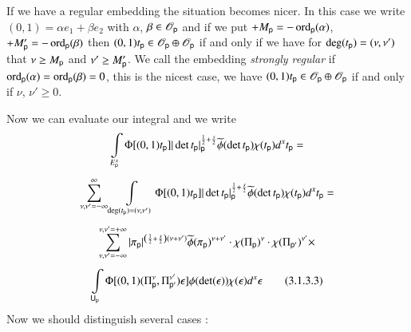 If we have a regular embedding the situation becomes nicer. In this case we write $(0,1)=\alpha e_{1}+\beta e_{2}$ with $\alpha$, $\beta\in \mathscr{O}_{\mathsf{p}}$ and if we put $+M_{\mathsf{p}}=-\operatorname{ord}_{\mathsf{p}} (\alpha)$, $+M'_{\mathsf{p}}=-\operatorname{ord}_{\mathsf{p}}(\beta)$ then $(0,1)t_{\mathsf{p}}\in \mathscr{O}_{\mathsf{p}}\oplus \mathscr{O}_{\mathsf{p}}$ if and only if we have for $\deg (t_{\mathsf{p}})=(\nu,\nu')$ that $\nu\geq M_{\mathsf{p}}$ and $\nu'\geq M'_{\mathsf{p}}$. We call the embedding {\em strongly regular} if $\operatorname{ord}_{\mathsf{p}}(\alpha)=\operatorname{ord}_{\mathsf{p}}(\beta)=0$, this is the nicest case, we have $(0,1)t_{\mathsf{p}}\in \mathscr{O}_{\mathsf{p}}\oplus \mathscr{O}_{\mathsf{p}}$ if and only if $\nu$, $\nu'\geq 0$.

Now we can evaluate our integral and we write
\begin{gather*}
\int\limits_{E^{x}_{\mathsf{p}}}\Phi[(0,1)t_{\mathsf{p}}]|\det t_{\mathsf{p}}|_{\mathsf{p}}^{\frac{1}{2}+\frac{s}{2}}\widetilde{\phi}(\det t_{\mathsf{p}})\chi(t_{\mathsf{p}})d^{x}t_{\mathsf{p}}=\\[4pt]
\sum\limits^{\infty}_{\nu,\nu'=-\infty}\int\limits_{\deg(t_{\mathsf{p}})=(\nu,\nu')}\Phi[(0,1)t_{\mathsf{p}}]|\det t_{\mathsf{p}}|_{\mathsf{p}}^{\frac{1}{2}+\frac{s}{2}}\widetilde{\phi}(\det t_{\mathsf{p}})\chi(t_{\mathsf{p}})d^{x}t_{\mathsf{p}}=\\[4pt]
\sum\limits^{\nu,\nu'= +\infty}_{\nu,\nu'=-\infty}|\pi_{\mathsf{p}}|^{\left(\frac{1}{2}+\frac{s}{2}\right)(\nu+\nu')}\widetilde{\phi}(\pi_{\mathsf{p}})^{\nu+\nu'}\cdot \chi(\Pi_{\mathsf{p}})^{\nu}\cdot \chi(\Pi_{\mathsf{p}'})^{\nu'}\times\\[4pt]
\int\limits_{\mathsf{U}_{\mathsf{p}}}\Phi[(0,1)(\Pi^{\nu}_{\mathsf{p}}, \Pi^{\nu'}_{\mathsf{p}'})\epsilon]\phi(\det(\epsilon))\chi(\epsilon)d^{x}\epsilon\tag{3.1.3.3}\label{art2-eq3.1.3.3}
\end{gather*}
Now we should distinguish several cases :
